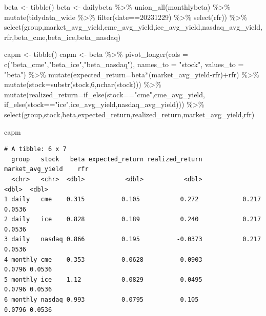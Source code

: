 \documentclass[
  letterpaper,
  DIV=11,
  numbers=noendperiod]{scrreprt}
\newenvironment{Shaded}{\begin{snugshade}}{\end{snugshade}}
\newcommand{\AttributeTok}[1]{\textcolor[rgb]{0.40,0.45,0.13}{#1}}
\newcommand{\DecValTok}[1]{\textcolor[rgb]{0.68,0.00,0.00}{#1}}
\newcommand{\FunctionTok}[1]{\textcolor[rgb]{0.28,0.35,0.67}{#1}}
\newcommand{\NormalTok}[1]{\textcolor[rgb]{0.00,0.23,0.31}{#1}}
\newcommand{\OtherTok}[1]{\textcolor[rgb]{0.00,0.23,0.31}{#1}}
\newcommand{\SpecialCharTok}[1]{\textcolor[rgb]{0.37,0.37,0.37}{#1}}
\newcommand{\StringTok}[1]{\textcolor[rgb]{0.13,0.47,0.30}{#1}}
\begin{document}
\begin{Shaded}
\begin{Highlighting}[]
\NormalTok{beta }\OtherTok{\textless{}{-}} \FunctionTok{tibble}\NormalTok{()}
\NormalTok{beta }\OtherTok{\textless{}{-}}\NormalTok{ dailybeta }\SpecialCharTok{\%\textgreater{}\%} 
  \FunctionTok{union\_all}\NormalTok{(monthlybeta) }\SpecialCharTok{\%\textgreater{}\%} 
  \FunctionTok{mutate}\NormalTok{(tidydata\_wide }\SpecialCharTok{\%\textgreater{}\%} \FunctionTok{filter}\NormalTok{(date}\SpecialCharTok{==}\DecValTok{20231229}\NormalTok{) }\SpecialCharTok{\%\textgreater{}\%} \FunctionTok{select}\NormalTok{(rfr)) }\SpecialCharTok{\%\textgreater{}\%} 
  \FunctionTok{select}\NormalTok{(group,market\_avg\_yield,cme\_avg\_yield,ice\_avg\_yield,nasdaq\_avg\_yield,}
\NormalTok{         rfr,beta\_cme,beta\_ice,beta\_nasdaq)}

\NormalTok{capm }\OtherTok{\textless{}{-}} \FunctionTok{tibble}\NormalTok{()}
\NormalTok{capm }\OtherTok{\textless{}{-}}\NormalTok{ beta }\SpecialCharTok{\%\textgreater{}\%} 
  \FunctionTok{pivot\_longer}\NormalTok{(}\AttributeTok{cols =} \FunctionTok{c}\NormalTok{(}\StringTok{"beta\_cme"}\NormalTok{,}\StringTok{"beta\_ice"}\NormalTok{,}\StringTok{"beta\_nasdaq"}\NormalTok{),}
               \AttributeTok{names\_to =} \StringTok{"stock"}\NormalTok{, }\AttributeTok{values\_to =} \StringTok{"beta"}\NormalTok{) }\SpecialCharTok{\%\textgreater{}\%} 
  \FunctionTok{mutate}\NormalTok{(}\AttributeTok{expected\_return=}\NormalTok{beta}\SpecialCharTok{*}\NormalTok{(market\_avg\_yield}\SpecialCharTok{{-}}\NormalTok{rfr)}\SpecialCharTok{+}\NormalTok{rfr) }\SpecialCharTok{\%\textgreater{}\%} 
  \FunctionTok{mutate}\NormalTok{(}\AttributeTok{stock=}\FunctionTok{substr}\NormalTok{(stock,}\DecValTok{6}\NormalTok{,}\FunctionTok{nchar}\NormalTok{(stock))) }\SpecialCharTok{\%\textgreater{}\%} 
  \FunctionTok{mutate}\NormalTok{(}\AttributeTok{realized\_return=}\FunctionTok{if\_else}\NormalTok{(stock}\SpecialCharTok{==}\StringTok{"cme"}\NormalTok{,cme\_avg\_yield,}
                                \FunctionTok{if\_else}\NormalTok{(stock}\SpecialCharTok{==}\StringTok{"ice"}\NormalTok{,ice\_avg\_yield,nasdaq\_avg\_yield))) }\SpecialCharTok{\%\textgreater{}\%} 
  \FunctionTok{select}\NormalTok{(group,stock,beta,expected\_return,realized\_return,market\_avg\_yield,rfr)}

\NormalTok{capm}
\end{Highlighting}
\end{Shaded}

\begin{verbatim}
# A tibble: 6 x 7
  group   stock   beta expected_return realized_return market_avg_yield    rfr
  <chr>   <chr>  <dbl>           <dbl>           <dbl>            <dbl>  <dbl>
1 daily   cme    0.315          0.105           0.272            0.217  0.0536
2 daily   ice    0.828          0.189           0.240            0.217  0.0536
3 daily   nasdaq 0.866          0.195          -0.0373           0.217  0.0536
4 monthly cme    0.353          0.0628          0.0903           0.0796 0.0536
5 monthly ice    1.12           0.0829          0.0495           0.0796 0.0536
6 monthly nasdaq 0.993          0.0795          0.105            0.0796 0.0536
\end{verbatim}
\end{document}
